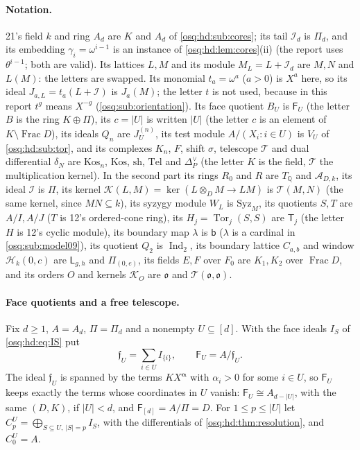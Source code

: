 \documentclass[11pt,letterpaper]{article}
\numberwithin{equation}{section}
\theoremstyle{definition}
\theoremstyle{remark}
\theoremstyle{plain}
\newcommand{\Q}{\mathbb Q}
\newcommand{\A}{\mathcal A}          %
\newcommand{\Frac}{\operatorname{Frac}}
\newcommand{\Tor}{\operatorname{Tor}}
\begin{document}
\paragraph{Notation.} 21's field $k$ and ring $A_d$ are $K$ and $A_d$ of \cref{osq:hd:sub:cores}; its tail $\mathcal I_d$ is $\Pi_d$,
and its embedding $\gamma_i=\omega^{i-1}$ is an instance of \cref{osq:hd:lem:cores}(ii) (the report uses $\theta^{i-1}$; both are
valid). Its lattices $L,M$ and its module $M_L=L+\mathcal I_d$ are $M,N$ and $L(M)$: the letters are swapped. Its monomial $t_a=\omega^a$
($a>0$) is $X^a$ here, so its ideal $J_{a,L}=t_a(L+\mathcal I)$ is $J_a(M)$; the letter $t$ is not used, because in this report $t^g$
means $X^{-g}$ (\cref{osq:sub:orientation}). Its face quotient $B_U$ is $\mathsf F_U$ (the letter $B$ is the ring $K\oplus\Pi$), its
$c=|U|$ is written $|U|$ (the letter $c$ is an element of $K\setminus\Frac D$), its ideals $Q_n$ are $J^{(n)}_U$, its test module
$A/(X_i:i\in U)$ is $V_U$ of \cref{osq:hd:sub:tor}, and its complexes $K_n$, $F$, shift $\sigma$, telescope $\mathcal T$ and dual
differential $\delta_N$ are $\mathrm{Kos}_n$, $\mathrm{Kos}$, $\mathrm{sh}$, $\mathrm{Tel}$ and $\Delta^\vee_P$ (the letter $K$ is the
field, $\mathcal T$ the multiplication kernel). In the second part its rings $R_0$ and $R$ are $T_\Q$ and $\A_{D,k}$, its ideal $\mathcal I$
is $\Pi$, its kernel $\mathcal K(L,M)=\ker(L\otimes_DM\to LM)$ is $\mathcal T(M,N)$ (the same kernel, since $MN\subseteq k$), its
syzygy module $W_L$ is $\mathrm{Syz}_M$, its quotients $S,T$ are $A/I,A/J$ ($T$ is 12's ordered-cone ring), its $H_j=\Tor_j(S,S)$ are
$\mathsf T_j$ (the letter $H$ is 12's cyclic module), its boundary map $\lambda$ is $\mathsf b$ ($\lambda$ is a cardinal in
\cref{osq:sub:model09}), its quotient $Q_2$ is $\operatorname{Ind}_2$, its boundary lattice $C_{a,b}$ and window $\mathcal H_k(0,c)$ are
$\mathsf L_{g,h}$ and $\Pi_{(0,e)}$, its fields $E,F$ over $F_0$ are $K_1,K_2$ over $\Frac D$, and its orders $O$ and kernels $\mathcal K_O$
are $\mathfrak o$ and $\mathcal T(\mathfrak o,\mathfrak o)$.

\paragraph{Face quotients and a free telescope.} Fix $d\ge1$, $A=A_d$, $\Pi=\Pi_d$ and a nonempty $U\subseteq[d]$. With the face ideals
$I_S$ of \eqref{osq:hd:eq:IS} put
\[
 \mathfrak f_U=\sum_{i\in U}I_{\{i\}},\qquad \mathsf F_U=A/\mathfrak f_U .
\]
The ideal $\mathfrak f_U$ is spanned by the terms $KX^{\boldsymbol\alpha}$ with $\alpha_i>0$ for some $i\in U$, so $\mathsf F_U$ keeps
exactly the terms whose coordinates in $U$ vanish: $\mathsf F_U\cong A_{d-|U|}$, with the same $(D,K)$, if $|U|<d$, and
$\mathsf F_{[d]}=A/\Pi=D$. For $1\le p\le|U|$ let $C^U_p=\bigoplus_{S\subseteq U,\ |S|=p}I_S$, with the differentials of
\cref{osq:hd:thm:resolution}, and $C^U_0=A$.
\end{document}
